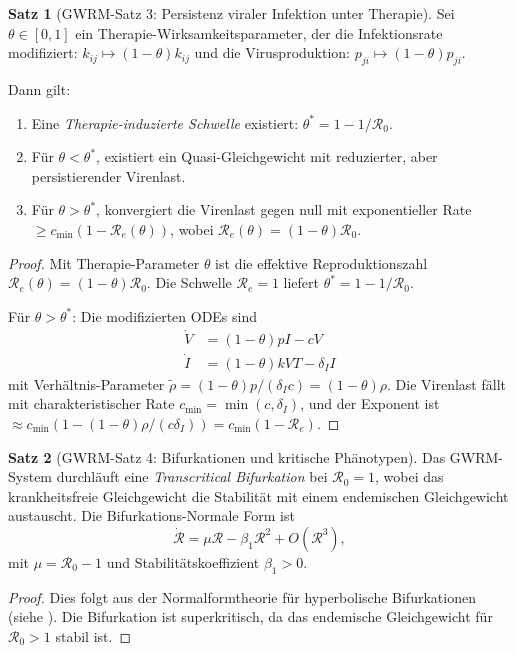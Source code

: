 ﻿\documentclass[a4paper,12pt]{article}
\theoremstyle{definition}
\newtheorem{satz}{Satz}
\begin{document}
\begin{satz}[GWRM-Satz 3: Persistenz viraler Infektion unter Therapie]
Sei $\theta \in [0,1]$ ein Therapie-Wirksamkeitsparameter, der die Infektionsrate modifiziert: $k_{ij} \mapsto (1-\theta) k_{ij}$ und die Virusproduktion: $p_{ji} \mapsto (1-\theta) p_{ji}$.

Dann gilt:
\begin{enumerate}
\item Eine \textit{Therapie-induzierte Schwelle} existiert: $\theta^* = 1 - 1/\mathcal{R}_0$. 
\item Für $\theta < \theta^*$, existiert ein Quasi-Gleichgewicht mit reduzierter, aber persistierender Virenlast.
\item Für $\theta > \theta^*$, konvergiert die Virenlast gegen null mit exponentieller Rate $\geq c_{\min}(1 - \mathcal{R}_e(\theta))$, wobei $\mathcal{R}_e(\theta) = (1-\theta) \mathcal{R}_0$.
\end{enumerate}
\end{satz}

\begin{proof}
Mit Therapie-Parameter $\theta$ ist die effektive Reproduktionszahl $\mathcal{R}_e(\theta) = (1-\theta) \mathcal{R}_0$. Die Schwelle $\mathcal{R}_e = 1$ liefert $\theta^* = 1 - 1/\mathcal{R}_0$.

Für $\theta > \theta^*$: Die modifizierten ODEs sind
\begin{align}
\dot{V} &= (1-\theta) p I - c V \\
\dot{I} &= (1-\theta) k V T - \delta_I I
\end{align}
mit Verhältnis-Parameter $\tilde{\rho} = (1-\theta) p / (\delta_I c) = (1-\theta) \rho$. Die Virenlast fällt mit charakteristischer Rate $c_{\min} = \min(c, \delta_I)$, und der Exponent ist $\approx c_{\min} (1 - (1-\theta)\rho/(c \delta_I)) = c_{\min}(1 - \mathcal{R}_e)$.
\end{proof}

\begin{satz}[GWRM-Satz 4: Bifurkationen und kritische Phänotypen]
Das GWRM-System durchläuft eine \emph{Transcritical Bifurkation} bei $\mathcal{R}_0 = 1$, wobei das krankheitsfreie Gleichgewicht die Stabilität mit einem endemischen Gleichgewicht austauscht. Die Bifurkations-Normale Form ist
\[
\dot{\mathcal{R}} = \mu \mathcal{R} - \beta_1 \mathcal{R}^2 + O(\mathcal{R}^3),
\]
mit $\mu = \mathcal{R}_0 - 1$ und Stabilitätskoeffizient $\beta_1 > 0$.
\end{satz}

\begin{proof}
Dies folgt aus der Normalformtheorie für hyperbolische Bifurkationen (siehe \cite{guckenheimer1983nonlinear}). Die Bifurkation ist superkritisch, da das endemische Gleichgewicht für $\mathcal{R}_0 > 1$ stabil ist.
\end{proof}
\end{document}
